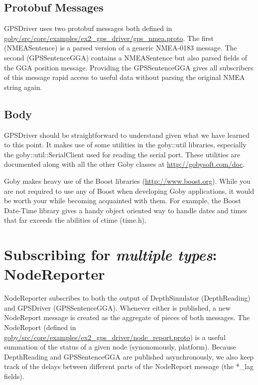 \documentclass[11pt, letterpaper, oneside]{memoir}
\begin{document}
\subsection{Protobuf Messages}
GPSDriver uses two protobuf messages both defined in \\ \href{http://bazaar.launchpad.net/~goby-dev/goby/trunk/annotate/head:/src/core/examples/ex2_gps_driver/gps_nmea.proto}{goby/src/core/examples/ex2\_gps\_driver/gps\_nmea.proto}. The first (NMEASentence) is a parsed version of a generic NMEA-0183 message. The second (GPSSentenceGGA) contains a NMEASentence but also parsed fields of the GGA position message. Providing the GPSSentenceGGA gives all subscribers of this message rapid access to useful data without parsing the original NMEA string again.

\subsection{Body}
GPSDriver should be straightforward to understand given what we have learned to this point. It makes use of some utilities in the goby::util libraries, especially the goby::util::SerialClient used for reading the serial port. These utilities are documented along with all the other Goby classes at \url{http://gobysoft.com/doc}.

Goby makes heavy use of the Boost libraries (\url{http://www.boost.org}). While you are not required to use any of Boost when developing Goby applications, it would be worth your while becoming acquainted with them. For example, the Boost Date-Time library gives a handy object oriented way to handle dates and times that far exceeds the abilities of ctime (time.h).

\section{Subscribing for \textit{multiple types}: NodeReporter}

NodeReporter subscribes to both the output of DepthSimulator (DepthReading) and GPSDriver (GPSSentenceGGA). Whenever either is published, a new NodeReport message is created as the aggregate of pieces of both messages. The NodeReport (defined in \\ \href{http://bazaar.launchpad.net/~goby-dev/goby/trunk/annotate/head:/src/core/xamples/ex2_gps_driver/node_report.proto}{goby/src/core/examples/ex2\_gps\_driver/node\_report.proto}) is a useful summation of the status of a given node (synonomously, platform). Because DepthReading and GPSSentenceGGA are published asynchronously, we also keep track of the delays between different parts of the NodeReport message (the *\_lag fields). 
\end{document}
